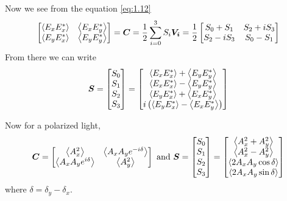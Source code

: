 \documentclass[11pt,a4paper]{article}
\numberwithin{equation}{section}
\begin{document}
Now we see from the equation \ref{eq:1.12}
\begin{align}
	\begin{bmatrix}
		\expval{E_xE_x^\ast} & \expval{E_xE_y^\ast}\\
		\expval{E_yE_x^\ast} & \expval{E_yE_y^\ast}
	\end{bmatrix}=
	\boldsymbol{C} = \frac{1}{2} \sum_{i=0}^{3} S_i \boldsymbol{V_i} = \frac{1}{2}
	\begin{bmatrix}
		S_0+S_1 & S_2+iS_3\\
		S_2-iS_3 & S_0-S_1
	\end{bmatrix}
\end{align}
From there we can write
\begin{align}
	\boldsymbol{S}= \begin{bmatrix} S_0\\ S_1\\ S_2\\S_3\end{bmatrix} =
	\begin{bmatrix}
		\expval{E_xE_x^\ast} + \expval{E_yE_y^\ast}\\
		\expval{E_xE_x^\ast} - \expval{E_yE_y^\ast}\\
		\expval{E_yE_x^\ast} + \expval{E_xE_y^\ast}\\
		i\left(\expval{E_yE_x^\ast} - \expval{E_xE_y^\ast}\right)
	\end{bmatrix} \label{eq:1.15}
\end{align}

Now for a polarized light, 
\begin{align}
	\boldsymbol{C}=
	\begin{bmatrix}
		\expval{A_x^2} & \expval{A_xA_ye^{-i\delta}}\\
		\expval{A_xA_ye^{i\delta}} & \expval{A_y^2}
	\end{bmatrix} \text{ and }
	\boldsymbol{S}= \begin{bmatrix} S_0\\ S_1\\ S_2\\S_3\end{bmatrix} =
	\begin{bmatrix}
		\expval{A_x^2 + A_y^2}\\
		\expval{A_x^2 - A_y^2}\\
		\expval{2A_xA_y\cos\delta}\\
		\expval{2A_xA_y\sin\delta}
	\end{bmatrix} \label{eq:1.16}
\end{align}
where $\delta= \delta_y-\delta_x$.
\end{document}
